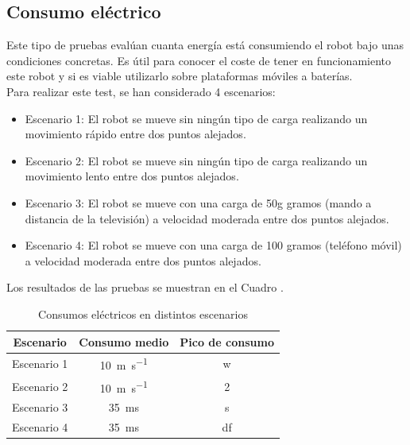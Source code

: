 \subsection{Consumo eléctrico} 
\label{sec:consumo}
\noindent Este tipo de pruebas evalúan cuanta energía está consumiendo el robot bajo unas condiciones concretas. Es útil para 
conocer el coste de tener en funcionamiento este robot y si es viable utilizarlo sobre plataformas móviles a baterías. 
\\
Para realizar este test, se han considerado 4 escenarios:
\begin{itemize}
\item Escenario 1: El robot se mueve sin ningún tipo de carga realizando un movimiento rápido entre dos puntos alejados.
\item Escenario 2: El robot se mueve sin ningún tipo de carga realizando un movimiento lento entre dos puntos alejados.
\item Escenario 3: El robot se mueve con una carga de 50g gramos (mando a distancia de la televisión) a velocidad moderada entre dos puntos alejados.
\item Escenario 4: El robot se mueve con una carga de 100 gramos (teléfono móvil) a velocidad moderada entre dos puntos alejados.

\end{itemize}
Los resultados de las pruebas se muestran en el Cuadro \label{cuadro:consumos}.
\begin{table}[H]
\begin{center}
\begin{tabular}{|c|c|c|}
\hline
\textbf{Escenario} & \textbf{Consumo medio} & \textbf{Pico de consumo}\\
\hline
Escenario 1 & \SI{10}{\meter\per\second} & w\\
Escenario 2 & \SI{10}{\meter\per\second} & 2\\
Escenario 3 & \SI{35}{\milli\second} & s \\
Escenario 4 & \SI{35}{\milli\second} & df\\
\hline
\end{tabular}
\caption{Consumos eléctricos en distintos escenarios}
\label{cuadro:consumos}
\end{center}
\end{table}